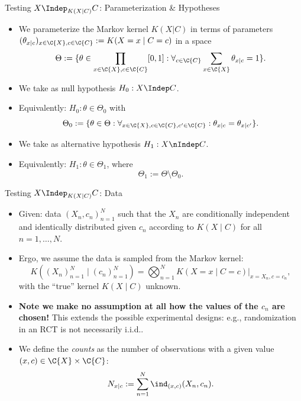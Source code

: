 \begin{frame}{Testing $X \Indep_{K(X|C)} C$: Parameterization \& Hypotheses}
  \begin{itemize}
    \item We parameterize the Markov kernel $K(X | C)$ in terms of parameters
$(\theta_{x|c})_{x\in\C{X},c\in\C{C}} := K(X = x \mid C = c)$ in a space
$$\Theta := \{ \theta \in \prod_{x\in\C{X},c\in\C{C}} [0,1] : \forall_{c\in\C{C}} \sum_{x\in\C{X}} \theta_{x|c} = 1\}.$$
    \item We take as null hypothesis $H_0 : X \Indep C$.
    \item Equivalently: $H_0 : \theta \in \Theta_0$ with 
      $$\Theta_0 := \{ \theta \in \Theta : \forall_{x\in\C{X},c\in\C{C},c'\in\C{C}}: \theta_{x|c} = \theta_{x|c'} \}.$$
    \item We take as alternative hypothesis $H_1 : X \nIndep C$.
    \item Equivalently: $H_1 : \theta \in \Theta_1$, where 
      $$\Theta_1 := \Theta \setminus \Theta_0.$$
  \end{itemize}
\end{frame}

\begin{frame}{Testing $X \Indep_{K(X|C)} C$: Data}
  \begin{itemize}
    \item Given: data $(X_n,c_n)_{n=1}^N$ such that the $X_n$ are conditionally independent and identically distributed given $c_n$ according to $K(X \mid C)$ for all $n=1,\dots,N$.
    \item Ergo, we assume the data is sampled from the Markov kernel:
      $$K((X_n)_{n=1}^N \mid (c_n)_{n=1}^N) = \bigotimes_{n=1}^N K(X=x \mid C=c)|_{x=X_n,c=c_n},$$
with the ``true'' kernel $K(X \mid C)$ unknown.
    \item \textbf{Note we make no assumption at all how the values of the $c_n$ are chosen!}
    This extends the possible experimental designs: e.g., randomization in an RCT is not necessarily i.i.d..
    \item We define the \emph{counts} as the number of observations with a given value $(x,c)\in\C{X}\times\C{C}$:
      $$N_{x|c} := \sum_{n=1}^N \ind_{(x,c)}(X_n,c_n).$$
  \end{itemize}
\end{frame}

